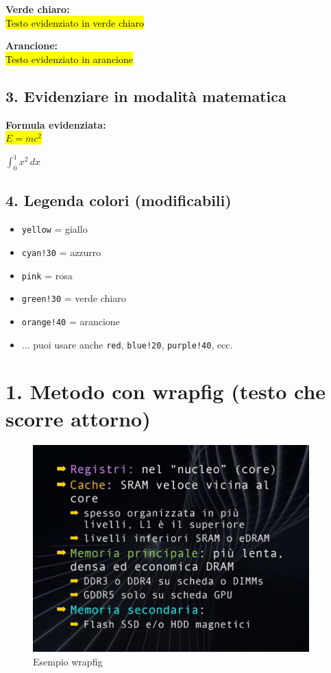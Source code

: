 \documentclass[12pt]{book}
\begin{document}
\vspace{5pt}
\textbf{Verde chiaro:}\\
{\hl{Testo evidenziato in verde chiaro}}

\vspace{5pt}
\textbf{Arancione:}\\
{\hl{Testo evidenziato in arancione}}

\subsection*{3. Evidenziare in modalità matematica}

\textbf{Formula evidenziata:}\\
\colorbox{yellow}{$E = mc^2$}

\vspace{5pt}
\colorbox{cyan!30}{$\int_0^1 x^2\,dx$}

\subsection*{4. Legenda colori (modificabili)}

\begin{itemize}
  \item \texttt{yellow} = giallo
  \item \texttt{cyan!30} = azzurro
  \item \texttt{pink} = rosa
  \item \texttt{green!30} = verde chiaro
  \item \texttt{orange!40} = arancione
  \item ... puoi usare anche \texttt{red}, \texttt{blue!20}, \texttt{purple!40}, ecc.

  
\end{itemize}

\newpage

\section*{1. Metodo con wrapfig (testo che scorre attorno)}
\begin{figure}
  \centering
  \includegraphics[width=0.95\textwidth]{images/Lez06_p02_fig_01.png}
  \caption{Esempio wrapfig}
\end{figure}
\lipsum[1-2] %
\end{document}
